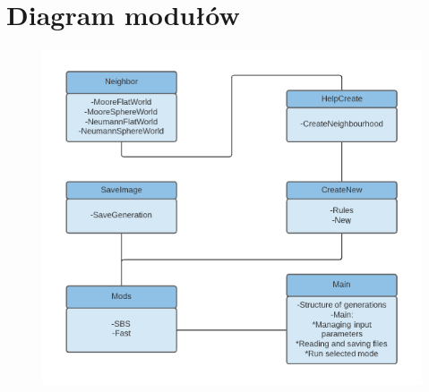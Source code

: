 \documentclass[a4paper]{article}
\begin{document}
\section{Diagram modu\l{}\'ow}
\begin{figure}[h]
	
	\centering
	\includegraphics[scale=1.8]{diagram}
\end{figure}
\end{document}
